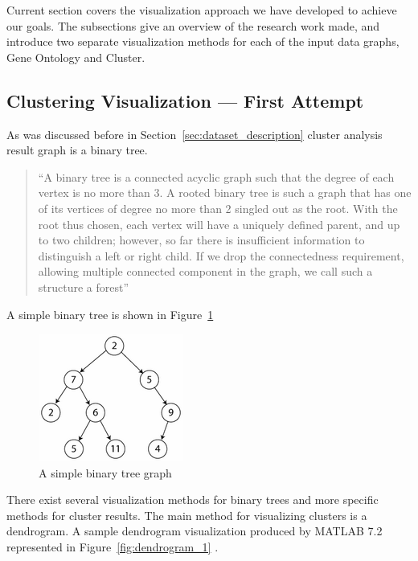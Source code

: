 
Current section covers the visualization approach we have developed to achieve our goals. The subsections give an overview of the research work made,
and introduce two separate visualization methods for each of the input data graphs, Gene Ontology and Cluster.


\subsection{Clustering Visualization --- First Attempt}
\label{sec:probe}

As was discussed before in Section~\ref{sec:dataset_description} cluster analysis result graph is a binary tree.

\begin{quotation}
``A binary tree is a connected acyclic graph such that the degree of each vertex is no more than 3.
A rooted binary tree is such a graph that has one of its vertices of degree no more than 2 singled out as the root.
With the root thus chosen, each vertex will have a uniquely defined parent, and up to two children; however, so far there is insufficient information to distinguish a left or right child.
If we drop the connectedness requirement, allowing multiple connected component in the graph, we call such a structure a forest''~\cite{BINARY_TREE}
\end{quotation}

A simple binary tree is shown in Figure~\ref{fig:simple_binary_tree}

\begin{figure}[h!]
\centering
\includegraphics[scale=1.0]{pictures/simple_binary_tree.png}
\caption{A simple binary tree graph}
\label{fig:simple_binary_tree}
\end{figure}

There exist several visualization methods for binary trees and more specific methods for cluster results.
The main method for visualizing clusters is a dendrogram. A sample dendrogram visualization produced by MATLAB 7.2 represented in Figure~\ref{fig:dendrogram_1} .

